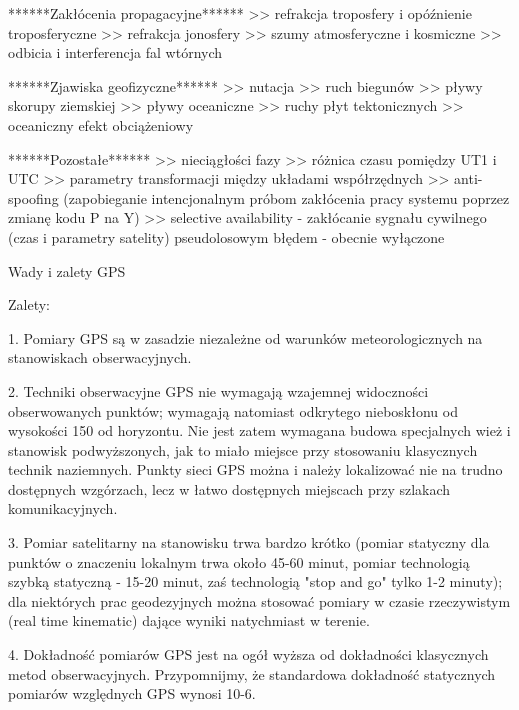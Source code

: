 ******Zakłócenia propagacyjne******
>>   refrakcja troposfery i opóźnienie troposferyczne
>>   refrakcja jonosfery
>>   szumy atmosferyczne i kosmiczne
>>   odbicia i interferencja fal wtórnych\newline

******Zjawiska geofizyczne******
>>   nutacja
>>   ruch biegunów
>>   pływy skorupy ziemskiej
>>   pływy oceaniczne
>>   ruchy płyt tektonicznych
>>   oceaniczny efekt obciążeniowy\newline

******Pozostałe******
>>   nieciągłości fazy
>>   różnica czasu pomiędzy UT1 i UTC
>>   parametry transformacji między układami współrzędnych
>>   anti-spoofing (zapobieganie intencjonalnym próbom zakłócenia pracy systemu poprzez zmianę kodu P na Y)
>>   selective availability - zakłócanie sygnału cywilnego (czas i parametry satelity) pseudolosowym błędem - obecnie wyłączone\newline


Wady i zalety GPS \newline

Zalety:\newline

1.  Pomiary GPS są w zasadzie niezależne od warunków meteorologicznych na stanowiskach obserwacyjnych.\newline 


2.  Techniki obserwacyjne GPS nie wymagają wzajemnej widoczności obserwowanych punktów; wymagają natomiast odkrytego nieboskłonu od wysokości 150 od horyzontu. Nie jest zatem wymagana budowa specjalnych wież i stanowisk podwyższonych, jak to miało miejsce przy stosowaniu klasycznych technik naziemnych. Punkty sieci GPS można i należy lokalizować nie na trudno dostępnych wzgórzach, lecz w łatwo dostępnych miejscach przy szlakach komunikacyjnych. \newline \newline


3.  Pomiar satelitarny na stanowisku trwa bardzo krótko (pomiar statyczny dla punktów o znaczeniu lokalnym trwa około 45-60 minut, pomiar technologią szybką statyczną - 15-20 minut, zaś technologią "stop and go" tylko 1-2 minuty); dla niektórych prac geodezyjnych można stosować pomiary w czasie rzeczywistym (real time kinematic) dające wyniki natychmiast w terenie.\newline


4.  Dokładność pomiarów GPS jest na ogół wyższa od dokładności klasycznych metod obserwacyjnych. Przypomnijmy, że standardowa dokładność statycznych pomiarów względnych GPS wynosi 10-6.\newline


